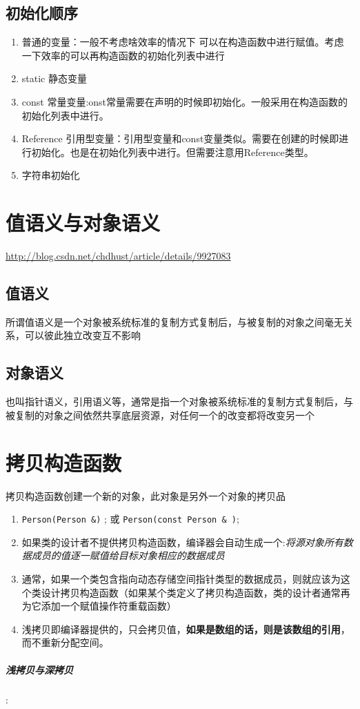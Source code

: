 \documentclass[UTF8,a4paper,12pt]{ctexbook} %
\begin{document}
	\subsection{初始化顺序}
		\begin{enumerate}
			\item 普通的变量：一般不考虑啥效率的情况下 可以在构造函数中进行赋值。考虑一下效率的可以再构造函数的初始化列表中进行
			\item static 静态变量
			\item const  常量变量:onst常量需要在声明的时候即初始化。一般采用在构造函数的初始化列表中进行。
			\item Reference 引用型变量：引用型变量和const变量类似。需要在创建的时候即进行初始化。也是在初始化列表中进行。但需要注意用Reference类型。
			\item 字符串初始化
		\end{enumerate}
\section{值语义与对象语义}
	\url{http://blog.csdn.net/chdhust/article/details/9927083}
	
	\subsection{值语义}
		所谓值语义是一个对象被系统标准的复制方式复制后，与被复制的对象之间毫无关系，可以彼此独立改变互不影响
	
	\subsection{对象语义}
		也叫指针语义，引用语义等，通常是指一个对象被系统标准的复制方式复制后，与被复制的对象之间依然共享底层资源，对任何一个的改变都将改变另一个
	
\section{拷贝构造函数} 拷贝构造函数创建一个新的对象，此对象是另外一个对象的拷贝品
	       \begin{enumerate}[fullwidth,itemindent=2em,label=(\arabic*)]		       
		       \item  \verb|Person(Person &)| ; 或 \verb|Person(const Person & )|;
		       
		       \item  如果类的设计者不提供拷贝构造函数，编译器会自动生成一个:\textit{将源对象所有数据成员的值逐一赋值给目标对象相应的数据成员}
		       
		       \item   通常，如果一个类包含指向动态存储空间指针类型的数据成员，则就应该为这个类设计拷贝构造函数（如果某个类定义了拷贝构造函数，类的设计者通常再为它添加一个赋值操作符重载函数）
		       
		       \item   浅拷贝即编译器提供的，只会拷贝值，\textbf{如果是数组的话，则是该数组的引用}，而不重新分配空间。  
		 \end{enumerate}   
		       \subparagraph{浅拷贝与深拷贝}:
		       
\end{document}

